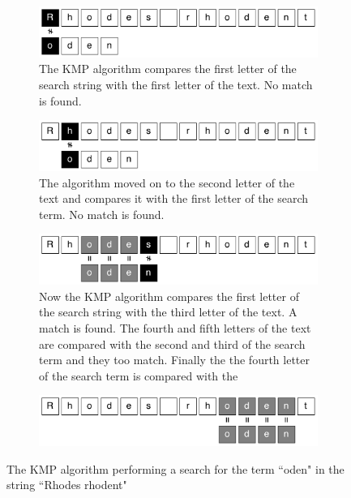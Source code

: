 \documentclass{article}
\begin{document}
\begin{figure}[h!bt]
  \label{fig:naive}
  \centering
  
  \begin{subfigure}{\textwidth}
  \makeatletter
  \includegraphics[width=\textwidth]{images/knuth-morris-pratt-1}
  \caption{The KMP algorithm compares the first letter of the search string with the first letter of the text. No match is found.}
  \end{subfigure}
  
  \begin{subfigure}{\textwidth}
  \makeatletter
  \includegraphics[width=\textwidth]{images/knuth-morris-pratt-2}
  \caption{The algorithm moved on to the second letter of the text and compares it with the first letter of the search term. No match is found.}
  \end{subfigure}
  
  \begin{subfigure}{\textwidth}
  \makeatletter
  \includegraphics[width=\textwidth]{images/knuth-morris-pratt-3}
  \caption{Now the KMP algorithm compares the first letter of the search string with the third letter of the text. A match is found. The fourth and fifth letters of the text are compared with the second and third of the search term and they too match. Finally the the fourth letter of the search term is compared with the }
  \end{subfigure}
  
  \begin{subfigure}{\textwidth}
  \makeatletter
  \includegraphics[width=\textwidth]{images/knuth-morris-pratt-4}
  \caption{}
  \end{subfigure}

  
  \caption{The KMP algorithm performing a search for the term ``oden" in the string ``Rhodes rhodent"}
  
\end{figure}
\end{document}
